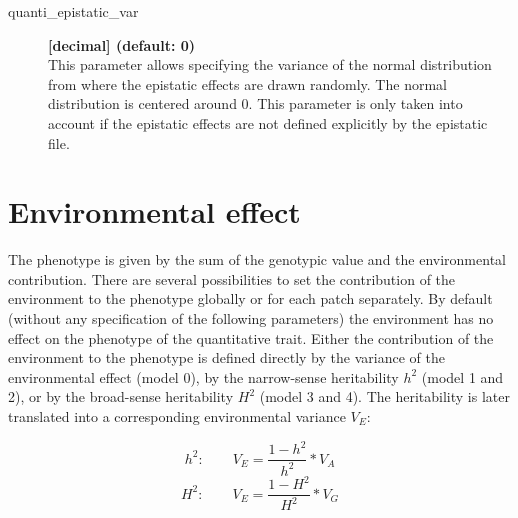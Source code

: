 \documentclass[letterpaper,12pt,oneside]{book}
\begin{document}
\begin{description}
\item[quanti\_epistatic\_var] \textbf{[decimal] (default: 0)} \\
This parameter allows specifying the variance of the normal distribution from where the epistatic effects are drawn randomly. The normal distribution is centered around 0. This parameter is only taken into account if the epistatic effects are not defined explicitly by the epistatic file.
\end{description}
\section{Environmental effect}

The phenotype is given by the sum of the genotypic value and the environmental contribution. There are several possibilities to set the contribution of the environment to the phenotype globally or for each patch separately. By default (without any specification of the following parameters) the environment has no effect on the phenotype of the quantitative trait. Either the contribution of the environment to the phenotype is defined directly by the variance of the environmental effect (model 0), by the narrow-sense heritability $h^{2}$ (model 1 and 2), or by the broad-sense heritability $H^{2}$ (model 3 and 4). The heritability is later translated into a corresponding environmental variance $V_{E}$: 

\[h^{2}: \qquad V_{E} = \frac{1-h^{2}}{h^{2}}*V_{A}\]
\[H^{2}: \qquad V_{E} = \frac{1-H^{2}}{H^{2}}*V_{G}\]
\end{document}
